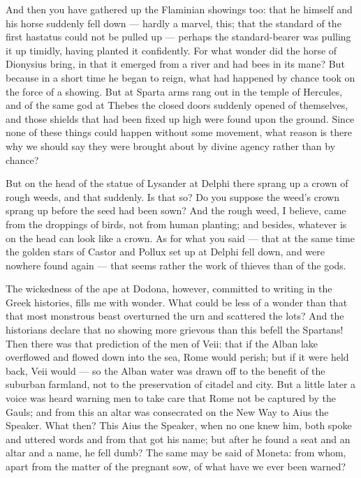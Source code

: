  And then you have gathered up the Flaminian showings too: that he himself and his horse suddenly fell down — hardly a marvel, this; that the standard of the first hastatus could not be pulled up — perhaps the standard-bearer was pulling it up timidly, having planted it confidently. For what wonder did the horse of Dionysius bring, in that it emerged from a river and had bees in its mane? But because in a short time he began to reign, what had happened by chance took on the force of a showing. But at Sparta arms rang out in the temple of Hercules, and of the same god at Thebes the closed doors suddenly opened of themselves, and those shields that had been fixed up high were found upon the ground. Since none of these things could happen without some movement, what reason is there why we should say they were brought about by divine agency rather than by chance?

 But on the head of the statue of Lysander at Delphi there sprang up a crown of rough weeds, and that suddenly. Is that so? Do you suppose the weed's crown sprang up before the seed had been sown? And the rough weed, I believe, came from the droppings of birds, not from human planting; and besides, whatever is on the head can look like a crown. As for what you said — that at the same time the golden stars of Castor and Pollux set up at Delphi fell down, and were nowhere found again — that seems rather the work of thieves than of the gods.

 The wickedness of the ape at Dodona, however, committed to writing in the Greek histories, fills me with wonder. What could be less of a wonder than that that most monstrous beast overturned the urn and scattered the lots? And the historians declare that no showing more grievous than this befell the Spartans! Then there was that prediction of the men of Veii: that if the Alban lake overflowed and flowed down into the sea, Rome would perish; but if it were held back, Veii would — so the Alban water was drawn off to the benefit of the suburban farmland, not to the preservation of citadel and city. But a little later a voice was heard warning men to take care that Rome not be captured by the Gauls; and from this an altar was consecrated on the New Way to Aius the Speaker. What then? This Aius the Speaker, when no one knew him, both spoke and uttered words and from that got his name; but after he found a seat and an altar and a name, he fell dumb? The same may be said of Moneta: from whom, apart from the matter of the pregnant sow, of what have we ever been warned?

